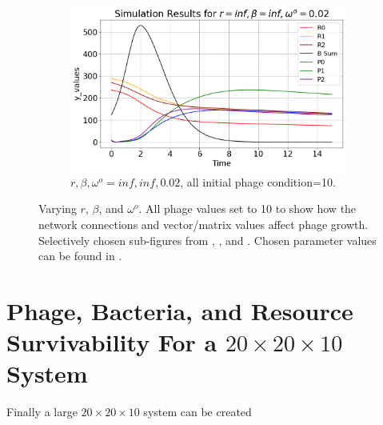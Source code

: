 \begin{figure}[]
\begin{subfigure}{0.32\linewidth}
        \includegraphics[width=\linewidth]{Images/Plots/Created/UA/r_beta_washout_inf_inf_0.02.png}
        \caption{
            $r, \beta, \omega^o = inf, inf, 0.02$, all initial phage condition=10. 
        }
        \label{fig:created:r_beta_washout_inf_inf_0.02}
    \end{subfigure}
    \caption{
        Varying $r$, $\beta$, and $\omega^o$. 
        All phage values set to 10 to show how the network connections and vector/matrix values affect phage growth. 
        Selectively chosen sub-figures from , , and . 
        Chosen parameter values can be found in . 
    }
\end{figure}

\section{Phage, Bacteria, and Resource Survivability For a $20\times20\times10$ System}
Finally a large $20\times20\times10$ system can be created